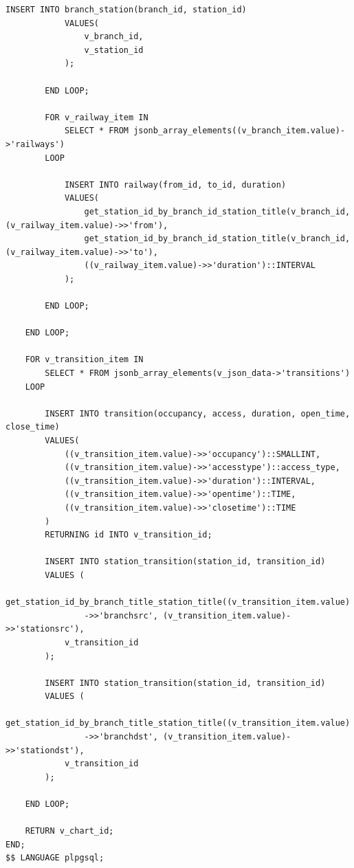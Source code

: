 \begin{lstlisting}[label=lst:add_chart_json:2,caption=Реализация функции добавления схемы (часть 2),firstnumber=59]
            INSERT INTO branch_station(branch_id, station_id)
            VALUES(
                v_branch_id,
                v_station_id
            );

        END LOOP;

        FOR v_railway_item IN
            SELECT * FROM jsonb_array_elements((v_branch_item.value)->'railways')
        LOOP

            INSERT INTO railway(from_id, to_id, duration)
            VALUES(
                get_station_id_by_branch_id_station_title(v_branch_id, (v_railway_item.value)->>'from'),
                get_station_id_by_branch_id_station_title(v_branch_id, (v_railway_item.value)->>'to'),
                ((v_railway_item.value)->>'duration')::INTERVAL
            );

        END LOOP;

    END LOOP;

    FOR v_transition_item IN
        SELECT * FROM jsonb_array_elements(v_json_data->'transitions')
    LOOP

        INSERT INTO transition(occupancy, access, duration, open_time, close_time)
        VALUES(
            ((v_transition_item.value)->>'occupancy')::SMALLINT,
            ((v_transition_item.value)->>'accesstype')::access_type,
            ((v_transition_item.value)->>'duration')::INTERVAL,
            ((v_transition_item.value)->>'opentime')::TIME,
            ((v_transition_item.value)->>'closetime')::TIME
        )
        RETURNING id INTO v_transition_id;

        INSERT INTO station_transition(station_id, transition_id)
        VALUES (
            get_station_id_by_branch_title_station_title((v_transition_item.value)
                ->>'branchsrc', (v_transition_item.value)->>'stationsrc'),
            v_transition_id
        );

        INSERT INTO station_transition(station_id, transition_id)
        VALUES (
            get_station_id_by_branch_title_station_title((v_transition_item.value)
                ->>'branchdst', (v_transition_item.value)->>'stationdst'),
            v_transition_id
        );

    END LOOP;

    RETURN v_chart_id;
END;
$$ LANGUAGE plpgsql;
\end{lstlisting}

